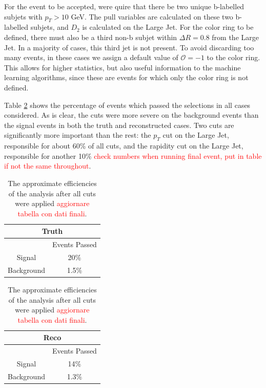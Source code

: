 \documentclass[10pt,a4paper]{book}
\newcommand\todo[1]{\textcolor{red}{#1}}
\begin{document}
For the event to be accepted, were quire that there be two unique b-labelled subjets with $p_T > 10$ GeV. The pull variables are calculated on these two b-labelled subjets, and $D_2$ is calculated on the Large Jet. For the color ring to be defined, there must also be a third non-b subjet within $\Delta R = 0.8$ from the Large Jet. In a majority of cases, this third jet is not present. To avoid discarding too many events, in these cases we assign a default value of $\mathcal{O} = -1$ to the color ring. This allows for higher statistics, but also useful information to the machine learning algorithms, since these are events for which only the color ring is not defined.

Table \ref{Efficiencies table} shows the percentage of events which passed the selections in all cases considered. As is clear, the cuts were more severe on the background events than the signal events in both the truth and reconstructed cases. Two cuts are significantly more important than the rest: the $p_T$ cut on the Large Jet, responsible for about 60\% of all cuts, and the rapidity cut on the Large Jet, responsible for another 10\% \todo{check numbers when running final event, put in table if not the same throughout}.

\begin{table}[!htb]
    \label{Efficiencies table}
    \begin{minipage}{.5\linewidth}
      \centering
        \begin{tabular}{|c|c|}
		\hline 
		\multicolumn{2}{|c|}{\textbf{Truth}} \\ 
		\hline 
		\* & Events Passed \\ 
		\hline 
		Signal & 20\% \\ 
		\hline 
		Background & 1.5\% \\ 
		\hline 
		\end{tabular}  
    \end{minipage}%
    \begin{minipage}{.5\linewidth}
      \centering
        \begin{tabular}{|c|c|}
		\hline 
		\multicolumn{2}{|c|}{\textbf{Reco}} \\ 
		\hline 
		\* & Events Passed \\ 
		\hline 
		Signal & 14\% \\ 
		\hline 
		Background & 1.3\% \\ 
		\hline 
		\end{tabular} 
    \end{minipage} 
    \caption{The approximate efficiencies of the analysis after all cuts were applied \todo{aggiornare tabella con dati finali}.}
\end{table}
\end{document}
